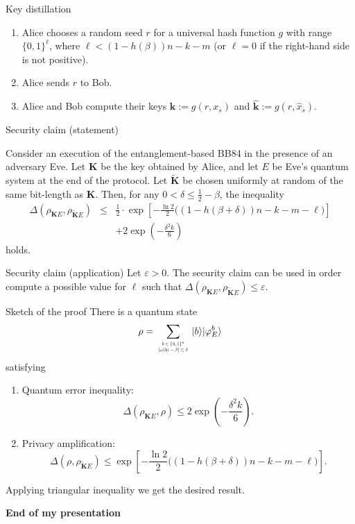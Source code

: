 \documentclass{beamer}
\begin{document}
\begin{frame}{Key distillation}
\begin{enumerate}[label=(\roman*)]
\item Alice chooses a random seed $r$ for a universal hash function $g$ with range $\{0,1\}^{\ell}$, where $\ell < \left(1 - h(\beta)\right) n - k - m$ (or $\ell = 0$ if the right-hand side is not positive).
\item Alice sends $r$ to Bob.
\item Alice and Bob compute their keys $\mathbf{k} := g(r, x_{\overline{s}})$ and $\mathbf{\hat{k}} := g(r, \hat{x}_{\overline{s}})$.
\end{enumerate}
\end{frame}

\begin{frame}{Security claim (statement)}

Consider an execution of the entanglement-based BB84 in the presence of an adversary Eve. Let $\mathbf{K}$ be the key obtained by Alice, and let $E$ be Eve's quantum system at the end of the protocol. Let $\mathbf{\tilde{K}}$ be chosen uniformly at random of the same bit-length as $\mathbf{K}$. Then, for any $0 < \delta \leq \frac{1}{2}-\beta$, the inequality
\begin{eqnarray*}
\Delta\left( \rho_{\mathbf{K}E}, \rho_{\mathbf{\tilde{K}}E} \right) &\leq& \frac{1}{2} \cdot \exp\left[ -\frac{\ln 2}{2} \bigg( (1 - h(\beta+\delta))n - k - m - \ell \bigg) \right] \\
& & + 2\exp\left( -\frac{\delta^2 k}{6} \right)
\end{eqnarray*}
holds.

\end{frame}

\begin{frame}{Security claim (application)}
Let  $\varepsilon > 0$. The security claim can be used in order compute a possible value for $\ell$ such that $\Delta\left( \rho_{\mathbf{K}E}, \rho_{\mathbf{\tilde{K}}E} \right) \leq \varepsilon$.
\end{frame}

\begin{frame}{Sketch of the proof}
There is a quantum state 
$$\rho = \sum_{\scalebox{0.5}{$\begin{array}{c} b\in\{0,1\}^n \\ |\omega(b) - \beta|\leq \delta \end{array}$}} |b\rangle |\varphi_E^b\rangle$$satisfying
\begin{enumerate}[label=(\roman*)]
\item Quantum error inequality: $$\Delta\left( \rho_{\mathbf{K}E}, \rho \right) \leq 2\exp\left( -\frac{\delta^2 k}{6} \right).$$
\item Privacy amplification: $$\Delta\left(\rho, \rho_{\mathbf{\tilde{K}}E} \right) \leq \exp\left[ -\frac{\ln 2}{2} \bigg( (1 - h(\beta+\delta))n - k - m - \ell \bigg) \right].$$
\end{enumerate}

Applying triangular inequality we get the desired result.
\end{frame}



\begin{frame}
\begin{center}
\Large{\textbf{End of my presentation} }
\end{center}
\end{frame}
\end{document}
